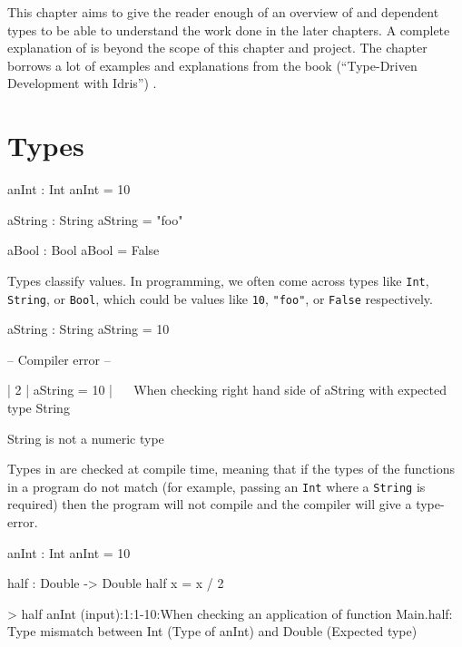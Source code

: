 This chapter aims to give the reader enough of an overview of \Idris and dependent types to be able to understand the work done in the later chapters. A complete explanation of \Idris is beyond the scope of this chapter and project. The chapter borrows a lot of examples and explanations from the \Idris book (``Type-Driven Development with Idris'') \cite{brady_2017}.

\section{Types}

    \begin{code}[caption={In \Idris, the type of a function is specified using `\texttt{:}'}]
        anInt : Int
        anInt = 10
        
        aString : String
        aString = "foo"
        
        aBool : Bool
        aBool = False
    \end{code}

    Types classify values. In programming, we often come across types like \texttt{Int}, \texttt{String}, or \texttt{Bool}, which could be values like \texttt{10}, \texttt{"foo"}, or \texttt{False} respectively.

    \newpage

    \begin{code}[caption={Mismatching types}, escapeinside={(*}{*)}]
        aString : String
        aString = 10
        
        
        -- Compiler error --
        
          |
        2 | aString = 10
          |           ~~
        When checking right hand side of aString with expected type
        String
        
        String is not a numeric type
    \end{code}
    Types in \Idris are checked at compile time, meaning that if the types of the functions in a program do not match (for example, passing an \texttt{Int} where a \texttt{String} is required) then the program will not compile and the compiler will give a type-error.
    
    \begin{code}[label={des:no-cast}, caption={Values are not automatically cast}]
anInt : Int
anInt = 10

half : Double -> Double
half x = x / 2


> half anInt
(input):1:1-10:When checking an application of function Main.half:
        Type mismatch between
                Int (Type of anInt)
        and
                Double (Expected type)
    \end{code}
    
